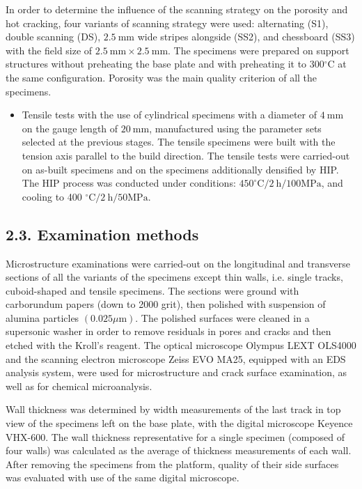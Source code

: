 \documentclass[10pt]{article}
\begin{document}
In order to determine the influence of the scanning strategy on the porosity and hot cracking, four variants of scanning strategy were used: alternating (S1), double scanning (DS), $2.5 \mathrm{~mm}$ wide stripes alongside (SS2), and chessboard (SS3) with the field size of $2.5 \mathrm{~mm} \times 2.5 \mathrm{~mm}$. The specimens were prepared on support structures without preheating the base plate and with preheating it to $300{ }^{\circ} \mathrm{C}$ at the same configuration. Porosity was the main quality criterion of all the specimens.

\begin{itemize}
  \item Tensile tests with the use of cylindrical specimens with a diameter of $4 \mathrm{~mm}$ on the gauge length of $20 \mathrm{~mm}$, manufactured using the parameter sets selected at the previous stages. The tensile specimens were built with the tension axis parallel to the build direction. The tensile tests were carried-out on as-built specimens and on the specimens additionally densified by HIP. The HIP process was conducted under conditions: $450^{\circ} \mathrm{C} / 2 \mathrm{~h} / 100 \mathrm{MPa}$, and cooling to 400 ${ }^{\circ} \mathrm{C} / 2 \mathrm{~h} / 50 \mathrm{MPa}$.
\end{itemize}

\subsection*{2.3. Examination methods}
Microstructure examinations were carried-out on the longitudinal and transverse sections of all the variants of the specimens except thin walls, i.e. single tracks, cuboid-shaped and tensile specimens. The sections were ground with carborundum papers (down to 2000 grit), then polished with suspension of alumina particles $(0.025 \mu \mathrm{m})$. The polished surfaces were cleaned in a supersonic washer in order to remove residuals in pores and cracks and then etched with the Kroll's reagent. The optical microscope Olympus LEXT OLS4000 and the scanning electron microscope Zeiss EVO MA25, equipped with an EDS analysis system, were used for microstructure and crack surface examination, as well as for chemical microanalysis.

Wall thickness was determined by width measurements of the last track in top view of the specimens left on the base plate, with the digital microscope Keyence VHX-600. The wall thickness representative for a single specimen (composed of four walls) was calculated as the average of thickness measurements of each wall. After removing the specimens from the platform, quality of their side surfaces was evaluated with use of the same digital microscope.
\end{document}
